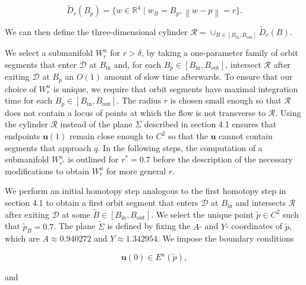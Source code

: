 \documentclass{ws-ijbc}
\begin{document}
\begin{equation*}
\widetilde{D}_r(B_p)=\{w \in \mathbb{R}^4 \;|\; w_B = B_p, \left\lVert w-p \right\lVert  = r\}.
\end{equation*}

\noindent
We can then define the three-dimensional cylinder $\mathscr{R} = \cup_{B \in [B_{\mathrm{in}}, B_{\mathrm{out}}]}\widetilde{D}_r(B)$.  

We select a submanifold $W^u_r$ for $r>\delta$, by taking a one-parameter family of orbit segments that enter $\mathscr{D}$ at $B_{\mathrm{in}}$ and, for each $B_p \in [B_{\mathrm{in}}, B_{\mathrm{out}}]$, intersect $\mathscr{R}$ after exiting $\mathscr{D}$ at $B_p$ an $O(1)$ amount of slow time afterwards.  To ensure that our choice of $W^u_r$ is unique, we require that orbit segments have maximal integration time for each $B_p \in [B_{\mathrm{in}}, B_{\mathrm{out}}]$.  The radius $r$ is chosen small enough so that $\mathscr{R}$ does not contain a locus of points at which the flow is not transverse to $\mathscr{R}$.  Using the cylinder $\mathscr{R}$ instead of the plane $\Sigma$ described in section 4.1 ensures that endpoints $\mathbf{u}(1)$ remain close enough to $C^2$ so that the $\mathbf{u}$ cannot contain segments that approach $q$.  In the following steps, the computation of a submanifold $W^u_{r^*}$ is outlined for $r^*=0.7$ before the description of the necessary modifications to obtain $W^u_r$ for more general $r$. 

We perform an initial homotopy step analogous to the first homotopy step in section 4.1 to obtain a first orbit segment that enters $\mathscr{D}$ at $B_{\mathrm{in}}$ and intersects $\mathscr{R}$ after exiting $\mathscr{D}$ at some $\tilde{B} \in [B_{\mathrm{in}}, B_{\mathrm{out}}]$.  We select the unique point $\tilde{p} \in C^2$ such that $\tilde{p}_B=0.7$.  The plane $\tilde{\Sigma}$ is defined by fixing the $A$- and $Y$- coordinates of $\tilde{p}$, which are $A \approx 0.940272$ and $Y \approx 1.342954$.  We impose the boundary conditions

\begin{equation}
\mathbf{u}(0) \in E^u(\tilde{p}),
\label{BC1_unstable}
\end{equation}

\noindent
and 
\end{document}
